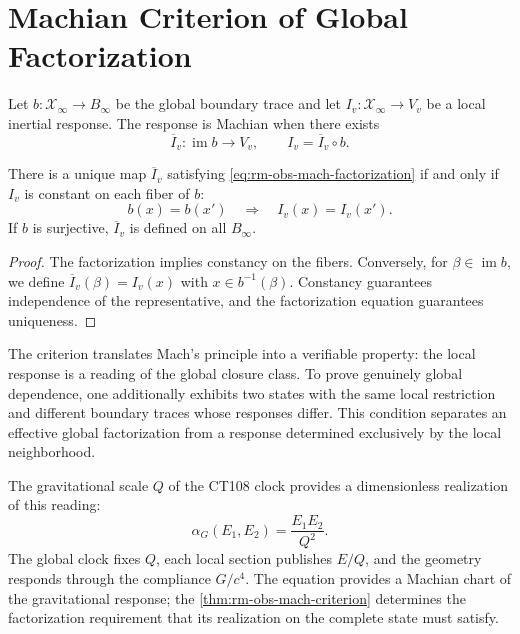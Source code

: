 \section{Machian Criterion of Global Factorization}

Let \(b:\mathcal X_\infty\to B_\infty\) be the global boundary trace and let
\(I_v:\mathcal X_\infty\to V_v\) be a local inertial response. The
response is Machian when there exists
\begin{equation}
 \overline I_v:\operatorname{im}b\longrightarrow V_v,
 \qquad
 I_v=\overline I_v\circ b.
 \label{eq:rm-obs-mach-factorization}
\end{equation}

\begin{theorem}
\label{thm:rm-obs-mach-criterion}
There is a unique map \(\overline I_v\) satisfying
\cref{eq:rm-obs-mach-factorization} if and only if \(I_v\) is constant
on each fiber of \(b\):
\begin{equation}
 b(x)=b(x')\quad\Longrightarrow\quad I_v(x)=I_v(x').
 \label{eq:rm-obs-mach-fiber-criterion}
\end{equation}
If \(b\) is surjective, \(\overline I_v\) is defined on all
\(B_\infty\).
\end{theorem}

\begin{proof}
The factorization implies constancy on the fibers. Conversely, for
\(\beta\in\operatorname{im}b\), we define
\(\overline I_v(\beta)=I_v(x)\) with \(x\in b^{-1}(\beta)\). Constancy
guarantees independence of the representative, and the factorization equation
guarantees uniqueness.
\end{proof}

The criterion translates Mach's principle into a verifiable property: the
local response is a reading of the global closure class. To prove
genuinely global dependence, one additionally exhibits two states with the same
local restriction and different boundary traces whose responses differ.
This condition separates an effective global factorization from a response
determined exclusively by the local neighborhood.

The gravitational scale \(Q\) of the CT108 clock provides a dimensionless realization
of this reading:
\begin{equation}
 \alpha_G(E_1,E_2)=\frac{E_1E_2}{Q^2}.
 \label{eq:rm-obs-global-clock-coupling}
\end{equation}
The global clock fixes \(Q\), each local section publishes \(E/Q\), and the
geometry responds through the compliance \(G/c^4\). The equation
provides a Machian chart of the gravitational response; the
\cref{thm:rm-obs-mach-criterion} determines the factorization requirement
that its realization on the complete state must satisfy.

